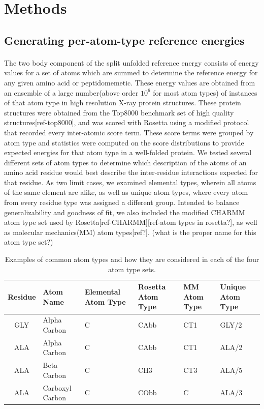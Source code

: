 \section{Methods}

\subsection{Generating per-atom-type reference energies}
\paragraph{}
The two body component of the split unfolded reference energy consists of energy values for a set of atoms which are summed to determine the reference energy for any given amino acid or peptidomemetic.
These energy values are obtained from an ensemble of a large number(above order $10^6$ for most atom types) of instances of that atom type in high resolution X-ray protein structures.
These protein structures were obtained from the Top8000 benchmark set of high quality structures[ref-top8000], and was scored with Rosetta using a modified protocol that recorded every inter-atomic score term.
These score terms were grouped by atom type and statistics were computed on the score distributions to provide expected energies for that atom type in a well-folded protein.
We tested several different sets of atom types to determine which description of the atoms of an amino acid residue would best describe the inter-residue interactions expected for that residue.
As two limit cases, we examined elemental types, wherein all atoms of the same element are alike, as well as unique atom types, where every atom from every residue type was assigned a different group.
Intended to balance generalizability and goodness of fit, we also included the modified CHARMM atom type set used by Rosetta[ref-CHARMM][ref-atom types in rosetta?], as well as molecular mechanics(MM) atom types[ref?].
(what is the proper name for this atom type set?)

\begin{table}[!htbp]

\fontsize{9pt}{9pt}
\selectfont

\begin{tabular}{c|lllll}
Residue & Atom Name & Elemental Atom Type & Rosetta Atom Type & MM Atom Type & Unique Atom Type\\
\hline
GLY & Alpha Carbon & C & CAbb & CT1 & GLY/2\\
ALA & Alpha Carbon & C & CAbb & CT1 & ALA/2\\
ALA & Beta Carbon & C & CH3 & CT3 & ALA/5\\
ALA & Carboxyl Carbon & C & CObb & C & ALA/3\\
\end{tabular}

\fontsize{10pt}{11pt}
\selectfont
\caption{Examples of common atom types and how they are considered in each of the four atom type sets.}
\label{tab:atypes_example}

\end{table}



